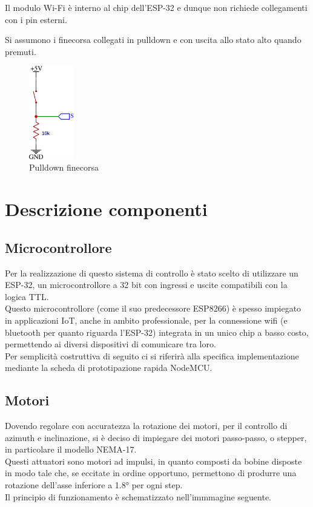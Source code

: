 \documentclass[12pt]{article}
\begin{document}
Il modulo Wi-Fi è interno al chip dell'ESP-32 e dunque non richiede collegamenti con i pin esterni.

Si assumono i finecorsa collegati in pulldown e con uscita allo stato alto quando premuti.\\

\begin{figure}[h]
\centering
    \includegraphics[width=55pt]{Draws/Pull_down.png}
    \caption{Pulldown finecorsa}
\end{figure}


\section{Descrizione componenti}
    \subsection{Microcontrollore}
    Per la realizzazione di questo sistema di controllo è stato scelto di utilizzare un ESP-32, un microcontrollore a 32 bit con ingressi e uscite compatibili con la logica TTL.\\
    Questo microcontrollore (come il suo predecessore ESP8266) è spesso impiegato in applicazioni IoT, anche in ambito professionale, per la connessione wifi (e bluetooth per quanto riguarda l'ESP-32) integrata in un unico chip a basso costo, permettendo ai diversi dispositivi di comunicare tra loro.\\
    Per semplicità costruttiva di seguito ci si riferirà alla specifica implementazione me\-dian\-te la scheda di prototipazione rapida NodeMCU.
    
    \subsection{Motori}
    Dovendo regolare con accuratezza la rotazione dei motori, per il controllo di azimuth e inclinazione, si è deciso di impiegare dei motori passo-passo, o stepper, in particolare il modello NEMA-17.\\
    Questi attuatori sono motori ad impulsi, in quanto composti da bobine disposte in modo tale che, se eccitate in ordine opportuno, permettono di produrre una rotazione dell'asse inferiore a 1.8° per ogni step.\\
    Il principio di funzionamento è schematizzato nell'immmagine seguente.\\
    
\end{document}
